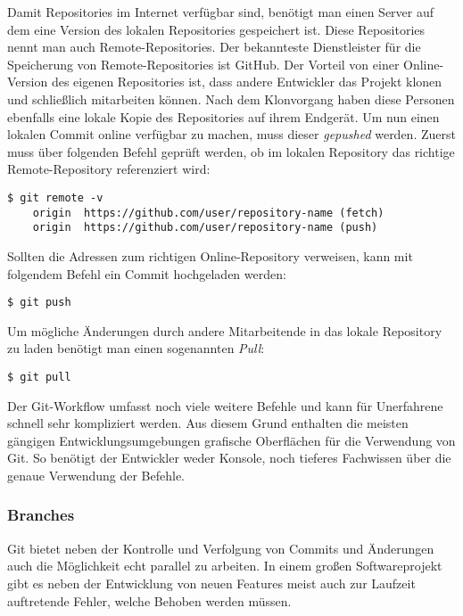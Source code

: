 Damit Repositories im Internet verfügbar sind, benötigt man einen Server auf dem
eine Version des lokalen Repositories gespeichert ist. Diese Repositories nennt
man auch Remote-Repositories. Der bekannteste Dienstleister für die Speicherung
von Remote-Repositories ist GitHub. Der Vorteil von einer Online-Version des
eigenen Repositories ist, dass andere Entwickler das Projekt klonen und
schließlich mitarbeiten können. Nach dem Klonvorgang haben diese Personen
ebenfalls eine lokale Kopie des Repositories auf ihrem Endgerät. Um nun einen
lokalen Commit online verfügbar zu machen, muss dieser \emph{gepushed} werden.
Zuerst muss über folgenden Befehl geprüft werden, ob im lokalen Repository das
richtige Remote-Repository referenziert wird:

\begin{lstlisting}[style=Bash]
    $ git remote -v
    origin	https://github.com/user/repository-name (fetch)
    origin	https://github.com/user/repository-name (push)
\end{lstlisting}

Sollten die Adressen zum richtigen Online-Repository verweisen, kann mit
folgendem Befehl ein Commit hochgeladen werden:

\begin{lstlisting}[style=Bash]
    $ git push
\end{lstlisting}

Um mögliche Änderungen durch andere Mitarbeitende in das lokale Repository zu
laden benötigt man einen sogenannten \emph{Pull}:

\begin{lstlisting}[style=Bash]
    $ git pull
\end{lstlisting}

Der Git-Workflow umfasst noch viele weitere Befehle und kann für Unerfahrene
schnell sehr kompliziert werden. Aus diesem Grund enthalten die meisten gängigen
Entwicklungsumgebungen grafische Oberflächen für die Verwendung von Git. So
benötigt der Entwickler weder Konsole, noch tieferes Fachwissen über die genaue
Verwendung der Befehle.

\subsubsection{Branches}
Git bietet neben der Kontrolle und Verfolgung von Commits und Änderungen auch
die Möglichkeit echt parallel zu arbeiten. In einem großen Softwareprojekt gibt
es neben der Entwicklung von neuen Features meist auch zur Laufzeit auftretende
Fehler, welche Behoben werden müssen.

